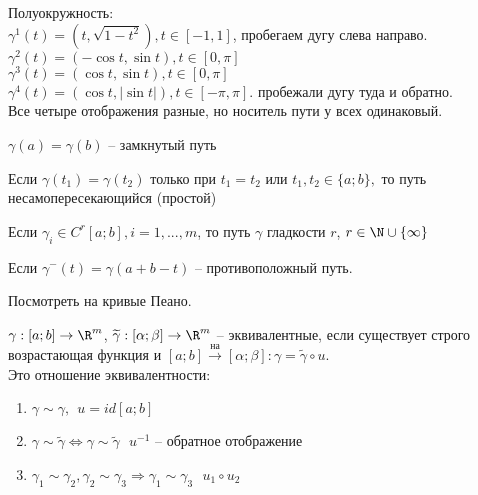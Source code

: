 \begin{Example}
	Полуокружность:\\
	$\gamma^1(t) = (t, \sqrt{1-t^2}), t \in [-1, 1]$, пробегаем дугу слева направо.\\
	$\gamma^2(t) = (- \cos t, \sin t), t \in [0, \pi]$\\
	$\gamma^3(t) = (\cos t, \sin t), t \in [0,\pi]$\\
	$\gamma^4(t) = (\cos t, |\sin t|), t \in [-\pi, \pi]$. пробежали дугу туда и обратно.\\
	Все четыре отображения разные, но носитель пути у всех одинаковый. 
\end{Example}

\begin{Def} 
	$\gamma(a) = \gamma(b)$ -- замкнутый путь
\end{Def} 

\begin{Def} 
	Если $\gamma(t_1) = \gamma(t_2)$ только при $t_1 = t_2$ или $t_1, t_2 \in \{a; b\},$ то путь 
	несамопересекающийся (простой)
\end{Def} 

\begin{Def} 
	Если $\gamma_i \in C^r[a;b], i = 1, ..., m$, то путь $\gamma$ гладкости $r$, $r \in \N \cup \{\infty\}$
\end{Def} 

\begin{Def} 
	Если $\gamma^-(t) = \gamma(a+b-t)$ -- противоположный путь.
\end{Def} 

\begin{Ex}
	Посмотреть на кривые Пеано. 
\end{Ex}

\begin{Def} 
	$\gamma: [a; b] \to \R^m$, $\widetilde{\gamma}: [\alpha; \beta] \to \R^m$ -- эквивалентные,
	если существует строго возрастающая функция и $[a;b] \overset{\text{на}}{\to} [\alpha; \beta]:
	\gamma = \widetilde{\gamma} \circ u$.\\ 
	Это отношение эквивалентности:
	\begin{enumerate}
		\item $\gamma \sim \gamma, \ \ u = id [a;b]$
		\item $\gamma \sim \widetilde{\gamma} \Leftrightarrow \gamma \sim \widetilde{\gamma} \ \ \ u^{-1}$ -- обратное отображение
		\item $\gamma_1 \sim \gamma_2, \gamma_2 \sim \gamma_3 \Rightarrow \gamma_1 \sim \gamma_3 \ \ \ u_1 \circ u_2$
	\end{enumerate}
\end{Def} 

